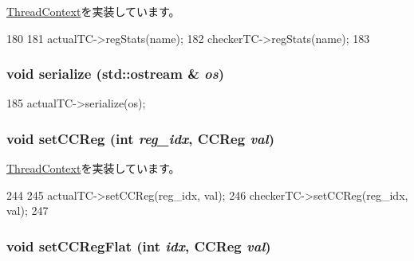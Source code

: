 \hyperlink{classThreadContext_a6450b5fad5603ec545c4bf5ff01e0646}{ThreadContext}を実装しています。


\begin{DoxyCode}
180     {
181         actualTC->regStats(name);
182         checkerTC->regStats(name);
183     }
\end{DoxyCode}
\hypertarget{classCheckerThreadContext_a53e036786d17361be4c7320d39c99b84}{
\subsubsection[{serialize}]{\setlength{\rightskip}{0pt plus 5cm}void serialize (std::ostream \& {\em os})}}
\label{classCheckerThreadContext_a53e036786d17361be4c7320d39c99b84}



\begin{DoxyCode}
185 { actualTC->serialize(os); }
\end{DoxyCode}
\hypertarget{classCheckerThreadContext_afd6c42b1888ad21a4382078ca7a86d09}{
\subsubsection[{setCCReg}]{\setlength{\rightskip}{0pt plus 5cm}void setCCReg (int {\em reg\_\-idx}, \/  {\bf CCReg} {\em val})}}
\label{classCheckerThreadContext_afd6c42b1888ad21a4382078ca7a86d09}


\hyperlink{classThreadContext_a276736f0c1f99f27ed95348979e8b8c6}{ThreadContext}を実装しています。


\begin{DoxyCode}
244     {
245         actualTC->setCCReg(reg_idx, val);
246         checkerTC->setCCReg(reg_idx, val);
247     }
\end{DoxyCode}
\hypertarget{classCheckerThreadContext_a6dec2284dd5904f992642f24bb289f14}{
\subsubsection[{setCCRegFlat}]{\setlength{\rightskip}{0pt plus 5cm}void setCCRegFlat (int {\em idx}, \/  {\bf CCReg} {\em val})}}
\label{classCheckerThreadContext_a6dec2284dd5904f992642f24bb289f14}


